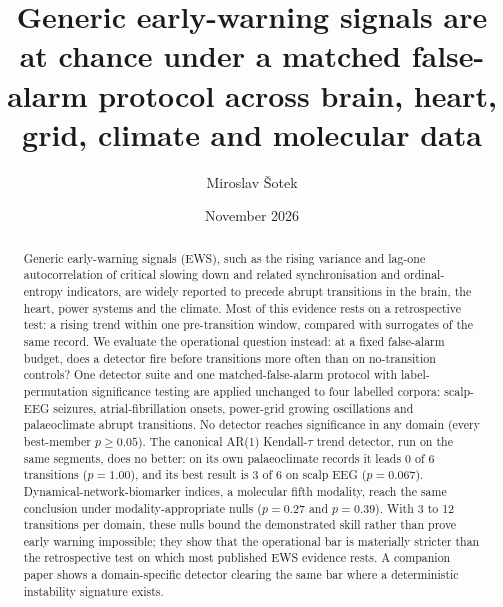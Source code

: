 \documentclass[aip,cha,preprint,amsmath,amssymb]{revtex4-2}
\begin{document}
\title{Generic early-warning signals are at chance under a matched
false-alarm protocol across brain, heart, grid, climate and molecular
data}
\author{Miroslav \v{S}otek}

\date{November 2026}

\begin{abstract}
Generic early-warning signals (EWS), such as the rising variance and
lag-one autocorrelation of critical slowing down and related
synchronisation and ordinal-entropy indicators, are widely reported to
precede abrupt transitions in the brain, the heart, power systems and
the climate. Most of this evidence rests on a retrospective test: a
rising trend within one pre-transition window, compared with surrogates
of the same record. We evaluate the operational question instead: at a
fixed false-alarm budget, does a detector fire before transitions more
often than on no-transition controls? One detector suite and one
matched-false-alarm protocol with label-permutation significance testing
are applied unchanged to four labelled corpora: scalp-EEG seizures,
atrial-fibrillation onsets, power-grid growing oscillations and
palaeoclimate abrupt transitions. No detector reaches significance in
any domain (every best-member $p \ge 0.05$). The canonical AR(1)
Kendall-$\tau$ trend detector, run on the same segments, does no
better: on its own palaeoclimate records it leads 0 of 6 transitions
($p = 1.00$), and its best result is 3 of 6 on scalp EEG ($p = 0.067$).
Dynamical-network-biomarker indices, a molecular fifth modality, reach
the same conclusion under modality-appropriate nulls ($p = 0.27$ and
$p = 0.39$). With 3 to 12 transitions per domain, these nulls bound the
demonstrated skill rather than prove early warning impossible; they show
that the operational bar is materially stricter than the retrospective
test on which most published EWS evidence rests. A companion paper
shows a domain-specific detector clearing the same bar where a
deterministic instability signature exists.
\end{abstract}

\maketitle
\end{document}
